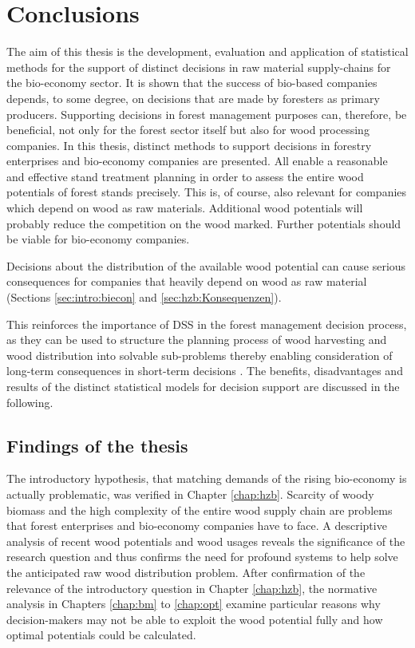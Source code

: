 \chapter{Conclusions}
\label{chap:discussion}
\newpage
\noindent
The aim of this thesis is the development, evaluation and application of statistical methods for the support of distinct decisions in raw material supply-chains for the bio-economy sector. It is shown that the success of bio-based companies depends, to some degree, on decisions that are made by foresters as primary producers. Supporting decisions in forest management purposes can, therefore, be beneficial, not only for the forest sector itself but also for wood processing companies. In this thesis, distinct methods to support decisions in forestry enterprises and bio-economy companies are presented. All enable a reasonable and effective stand treatment planning in order to assess the entire wood potentials of forest stands precisely. This is, of course, also relevant for companies which depend on wood as raw materials. Additional wood potentials will probably reduce the competition on the wood marked. Further potentials should be viable for bio-economy companies.

Decisions about the distribution of the available wood potential can cause serious consequences for companies that heavily depend on wood as raw material (Sections \ref{sec:intro:biecon} and \ref{sec:hzb:Konsequenzen}).

This reinforces the importance of DSS in the forest management decision process, as they can be used to structure the planning process of wood harvesting and wood distribution into solvable sub-problems thereby enabling consideration of long-term consequences in short-term decisions \citep[p. 1065-1067, 1081]{pretzsch_2008}. The benefits, disadvantages and results of the distinct statistical models for decision support are discussed in the following.

\section{Findings of the thesis}
\label{sec:discussion:findings}
The introductory hypothesis, that matching demands of the rising bio-economy is actually problematic, was verified in Chapter \ref{chap:hzb}. Scarcity of woody biomass and the high complexity of the entire wood supply chain are problems that forest enterprises and bio-economy companies have to face. A descriptive analysis of recent wood potentials and wood usages reveals the significance of the research question and thus confirms the need for profound systems to help solve the anticipated raw wood distribution problem. After confirmation of the relevance of the introductory question in Chapter \ref{chap:hzb}, the normative analysis in Chapters \ref{chap:bm} to \ref{chap:opt} examine particular reasons why decision-makers may not be able to exploit the wood potential fully and how optimal potentials could be calculated.

